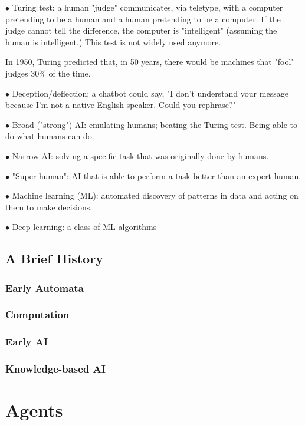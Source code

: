 \documentclass[english,openany]{book}
\begin{document}
    $\bullet$ Turing test: a human "judge" communicates, via teletype, with a computer pretending to be a human and a human pretending to be a computer. If the judge cannot tell the difference, the computer is "intelligent" (assuming the human is intelligent.) This test is not widely used anymore.

    In 1950, Turing predicted that, in 50 years, there would be machines that "fool" judges 30\% of the time.

    $\bullet$ Deception/deflection: a chatbot could say, "I don't understand your message because I'm not a native English speaker. Could you rephrase?"

    $\bullet$ Broad ("strong") AI: emulating humans; beating the Turing test. Being able to do what humans can do.

    $\bullet$ Narrow AI: solving a specific task that was originally done by humans.

    $\bullet$ "Super-human": AI that is able to perform a task better than an expert human.

    $\bullet$ Machine learning (ML): automated discovery of patterns in data and acting on them to make decisions.

    $\bullet$ Deep learning: a class of ML algorithms

    \section{A Brief History}


    \subsection{Early Automata}

    \subsection{Computation}

    \subsection{Early AI}

    \subsection{Knowledge-based AI}

    \chapter{Agents}
\end{document}

